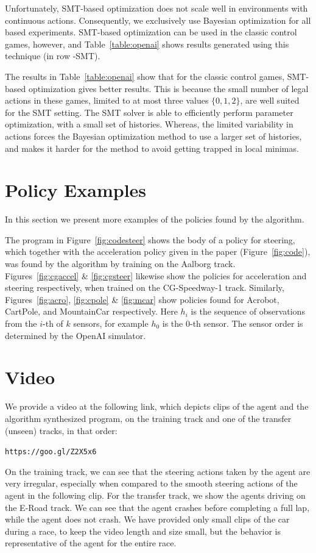 Unfortunately, SMT-based optimization does not scale well in environments with continuous actions. Consequently, we exclusively use Bayesian optimization for all \torcs based experiments. SMT-based optimization can be used in the classic control games, however, and Table~\ref{table:openai} shows results generated using this technique (in row \algo-SMT).

The results in Table~\ref{table:openai} show that for the classic control games, SMT-based optimization gives better results. This is because the small number of legal actions in these games, limited to at most three values $\{0,1,2\}$, are well suited for the SMT setting. The SMT solver is able to efficiently perform  parameter optimization, with a small set of histories. Whereas, the limited variability in actions forces the  Bayesian optimization method to use a larger set of histories, and makes it harder for the method to avoid getting trapped in local minimas. 

\section{Policy Examples}\label{sec:examples}
In this section we present more examples of the policies found by the \algo algorithm.

The program in Figure~\ref{fig:codesteer} shows the body of a policy for steering, which  together with the acceleration policy given in the paper (Figure~\ref{fig:code}), was found by the \algo algorithm  by training on the Aalborg track. Figures~\ref{fig:cgaccel} \& \ref{fig:cgsteer} likewise show the policies for acceleration and steering respectively, when trained on the CG-Speedway-1 track. Similarly, Figures~\ref{fig:acro}, \ref{fig:cpole} \& \ref{fig:mcar} show policies found for Acrobot, CartPole, and MountainCar respectively. Here $h_i$ is the sequence
of observations from the $i$-th of $k$ sensors, for example $h_0$ is the $0$-th sensor. The sensor order is determined by the OpenAI simulator.


\section{\torcs Video}
We provide a video at the following link, which depicts clips of the \drl agent and the \algo algorithm synthesized program, on the training track and one of the transfer (unseen) tracks, in that order:
 
\verb|https://goo.gl/Z2X5x6|

On the training track, we can see that the steering actions taken by the \drl agent are very irregular, especially when compared to the smooth steering actions of the \algo agent in the following clip. For the transfer track, we show the agents driving on the E-Road track. We can see that the \drl agent crashes before completing a full lap, while the \algo agent does not crash. We have provided only small clips of the car during a race, to keep the video length and size small, but the behavior is representative of the agent for the entire race.
